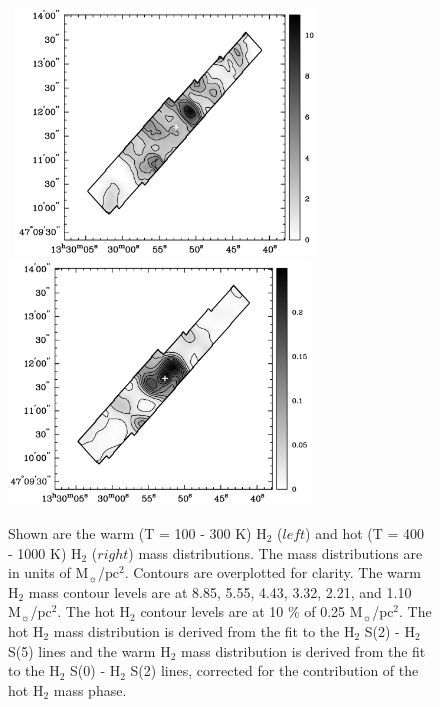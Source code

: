 \documentclass[manuscript]{aastex}
\begin{document}
\clearpage

\begin{figure}[!h]
\centerline{\hbox{\hspace{0.0in}
\includegraphics[width=8cm,angle=0]{bw_warm_h2_mass.jpg}
\hspace{0.1in}
\includegraphics[width=8cm,angle=0]{bw_hot_h2_mass.jpg}}}
\caption{Shown are the warm (T = 100 - 300 K) $\mathrm{H_2}$ ($left$) and hot (T = 400 - 1000 K) $\mathrm{H_2}$ ($right$) mass distributions.  The mass distributions are in units of $\mathrm{M_\sun}$/$\mathrm{pc^2}$.   Contours are overplotted for clarity.  The warm $\mathrm{H_2}$ mass contour levels are at 8.85, 5.55, 4.43, 3.32, 2.21, and 1.10 $\mathrm{M_\sun}$/$\mathrm{pc^2}$.  The hot $\mathrm{H_2}$ contour levels are at 10 \% of 0.25 $\mathrm{M_\sun}$/$\mathrm{pc^2}$.  The hot $\mathrm{H_2}$ mass distribution is derived from the fit to the $\mathrm{H_2}$ S(2) - $\mathrm{H_2}$ S(5) lines and the warm $\mathrm{H_2}$ mass distribution is derived from the fit to the $\mathrm{H_2}$ S(0) - $\mathrm{H_2}$ S(2) lines, corrected for the contribution of the hot $\mathrm{H_2}$ mass phase.  \label{fig3}}
\end{figure}

\clearpage
\end{document}
